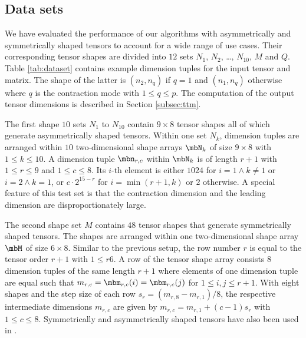  
\subsection{Data sets} 
We have evaluated the performance of our algorithms with asymmetrically and symmetrically shaped tensors to account for a wide range of use cases.
Their corresponding tensor shapes are divided into $12$ sets $N_1$, $N_2$, \dots, $N_{10}$, $M$ and $Q$.
Table \ref{tab:dataset} contains example dimension tuples for the input tensor and matrix.
The shape of the latter is $(n_2,n_q)$ if $q=1$ and $(n_1,n_q)$ otherwise where $q$ is the contraction mode with $1 \leq q \leq p$.
The computation of the output tensor dimensions is described in Section \ref{subsec:ttm}.

The first shape $10$ sets $N_1$ to $N_{10}$ contain $9 \times 8$ tensor shapes all of which generate asymmetrically shaped tensors.
Within one set $N_k$, dimension tuples are arranged within $10$ two-dimensional shape arrays $\mbN_k$ of size $9 \times 8$ with $1 \leq k \leq 10$.
A dimension tuple $\mbn_{r,c}$ within $\mbN_k$ is of length $r+1$ with $1 \leq r \leq 9$ and $1 \leq c \leq 8$.
Its $i$-th element is either $1024$ for $i = 1 \wedge k \neq 1$ or $i = 2 \wedge k = 1$, or $c \cdot 2^{15-r}$ for $i = \min(r+1,k)$ or $2$ otherwise.
A special feature of this test set is that the contraction dimension and the leading dimension are disproportionately large.

The second shape set $M$ contains $48$ tensor shapes that generate symmetrically shaped tensors.
The shapes are arranged within one two-dimensional shape array $\mbM$ of size $6 \times 8$.
Similar to the previous setup, the row number $r$ is equal to the tensor order $r+1$ with $1 \leq r 6$.
A row of the tensor shape array consists $8$ dimension tuples of the same length $r+1$ where elements of one dimension tuple are equal such that $m_{r,c} = \mbm_{r,c}(i) = \mbm_{r,c}(j)$ for $1 \leq i,j \leq r+1$.
With eight shapes and the step size of each row $s_r = (m_{r,8}-m_{r,1})/8$, the respective intermediate dimensions $m_{r,c}$ are given by $m_{r,c} = m_{r,1} + (c-1) s_r$ with $1 \leq c \leq 8$.
Symmetrically and asymmetrically shaped tensors have also been used in \cite{bassoy:2019:ttv, bassoy:2018:fast}.

